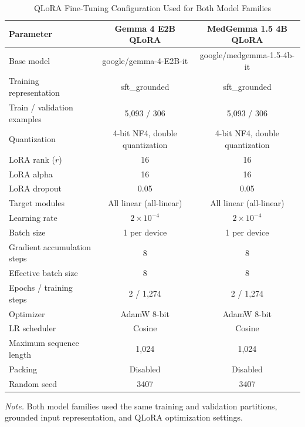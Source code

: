 \begin{table}[t]
\centering
\begin{threeparttable}
\caption{QLoRA Fine-Tuning Configuration Used for Both Model Families}
\label{tab:qlora-config}
\scriptsize
\begin{tabular*}{\textwidth}{@{\extracolsep{\fill}}lcc@{}}
\toprule
Parameter & Gemma 4 E2B QLoRA & MedGemma 1.5 4B QLoRA \\
\midrule
Base model & google/gemma-4-E2B-it & google/medgemma-1.5-4b-it \\
Training representation & sft\_grounded & sft\_grounded \\
Train / validation examples & 5,093 / 306 & 5,093 / 306 \\
Quantization & 4-bit NF4, double quantization & 4-bit NF4, double quantization \\
LoRA rank ($r$) & 16 & 16 \\
LoRA alpha & 16 & 16 \\
LoRA dropout & 0.05 & 0.05 \\
Target modules & All linear (all-linear) & All linear (all-linear) \\
Learning rate & $2 \times 10^{-4}$ & $2 \times 10^{-4}$ \\
Batch size & 1 per device & 1 per device \\
Gradient accumulation steps & 8 & 8 \\
Effective batch size & 8 & 8 \\
Epochs / training steps & 2 / 1,274 & 2 / 1,274 \\
Optimizer & AdamW 8-bit & AdamW 8-bit \\
LR scheduler & Cosine & Cosine \\
Maximum sequence length & 1,024 & 1,024 \\
Packing & Disabled & Disabled \\
Random seed & 3407 & 3407 \\
\bottomrule
\end{tabular*}
\begin{tablenotes}[flushleft]
\item[] \textit{Note.} Both model families used the same training and
validation partitions, grounded input representation, and QLoRA
optimization settings.
\end{tablenotes}
\end{threeparttable}
\end{table}

